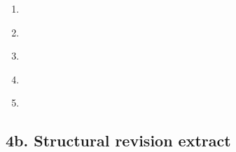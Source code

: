 
\begin{enumerate}
  \item \underline{\hspace{13cm}} \\[4pt]
        \underline{\hspace{13cm}}
  \vspace{0.4cm}
  \item \underline{\hspace{13cm}} \\[4pt]
        \underline{\hspace{13cm}}
  \vspace{0.4cm}
  \item \underline{\hspace{13cm}} \\[4pt]
        \underline{\hspace{13cm}}
  \vspace{0.4cm}
  \item \underline{\hspace{13cm}} \\[4pt]
        \underline{\hspace{13cm}}
  \vspace{0.4cm}
  \item \underline{\hspace{13cm}} \\[4pt]
        \underline{\hspace{13cm}}
\end{enumerate}

\subsection*{4b. Structural revision extract}


